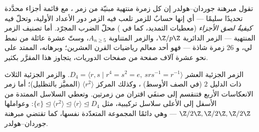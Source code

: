 \begin{remark}\label{rem:b3:groups:jhmeaning}
تقول مبرهنة جوردان--هولدر إن كل زمرة منتهية مبنيّة من زمر ،
مع قائمة أجزاء محدَّدة تحديدًا سليمًا --- أي إنها حسابٌ للزمر تلعب
فيه الزمر  دور الأعداد الأولية، وتحلّ فيه \emph{كيفيةُ
لصق الأجزاء} (معطيات التمديد، كما في ) محلّ
الضرب المجرّد. أما تصنيف الزمر  المنتهية --- الزمر الدائرية
$\Z/p\Z$، والزمر المتناوبة $A_{n \geq
5}$، وستّ عشرة عائلة من نمط لي،
و $26$ زمرة شاذة --- فهو أحد معالم رياضيات القرن العشرين؛ وبرهانه،
الممتد على نحو عشرة آلاف صفحة من صفحات الدوريات، يتجاوز هذا
المقرَّر بكثير.
\end{remark}

\begin{omfigure}

{\small الزمر الجزئية العشر  $D_4 = \langle r,
s \mid r^4 = s^2 = e,\ srs^{-1} = r^{-1}\rangle$. والزمر
الجزئية الثلاث ذات الدليل $2$ (في الصف الأوسط) ، وكذلك
المركز $\langle r^2\rangle$ (المميَّز بالتظليل)؛ أما زمر الانعكاسات الأربع
فتنقسم إلى صنفَي اقتران من زمرتين. وتعطي السلاسل الممتدة من
الأسفل إلى الأعلى سلاسل تركيبية، مثل $\{e\} \trianglelefteq \langle
r^2\rangle \trianglelefteq \langle r\rangle \trianglelefteq D_4$: وعواملها $\Z/2\Z, \Z/2\Z, \Z/2\Z$
--- وهي دائمًا المجموعة المتعدّدة نفسها، كما تقتضي مبرهنة
جوردان--هولدر.}
\end{omfigure}

